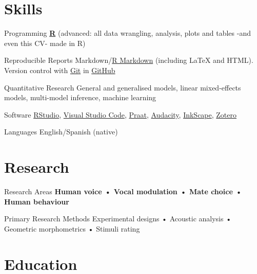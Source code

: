 \documentclass[11pt,a4paper,]{awesome-cv}
\begin{document}
\hypertarget{skills}{%
\section{Skills}\label{skills}}

\begin{cvskills}
  \cvskill
    {Programming}
    {\href{https://www.r-project.org/}{\textbf{R}} (advanced: all data wrangling, analysis, plots and tables -and even this CV- made in R)}

  \cvskill
    {Reproducible Reports}
    {Markdown/\href{https://rmarkdown.rstudio.com/}{R Markdown} (including {\selectfont\LaTeX} and HTML). Version control with \href{https://git-scm.com/}{Git} in \href{https://github.com/JDLeongomez}{GitHub} \faGithub}

  \cvskill
    {Quantitative Research}
    {General and generalised models, linear mixed-effects models, multi-model inference, machine learning}

  \cvskill
    {Software}
    {\href{https://posit.co/products/open-source/rstudio/}{RStudio}, \href{https://code.visualstudio.com/}{Visual Studio Code}, \href{https://www.fon.hum.uva.nl/praat/}{Praat}, \href{https://www.audacityteam.org/}{Audacity}, \href{https://inkscape.org/}{InkScape}, \href{https://www.zotero.org/}{Zotero}}

  \cvskill
    {Languages}
    {English/Spanish (native)}
\end{cvskills}

\hypertarget{research}{%
\section{Research}\label{research}}

\begin{cvskills}
  \cvskill
    {Research Areas}
    {\textbf{Human voice • Vocal modulation • Mate choice • Human behaviour}}

  \cvskill
    {Primary Research Methods}
    {Experimental designs • Acoustic analysis • Geometric morphometrics • Stimuli rating}
\end{cvskills}

\hypertarget{education}{%
\section{Education}\label{education}}
\end{document}
